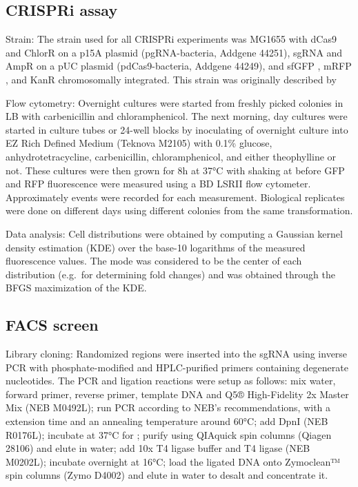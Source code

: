 \documentclass[10pt,oneside]{article}
\begin{document}
\subsection{CRISPRi assay}

Strain: The strain used for all CRISPRi experiments was \ecoli{} MG1655 with dCas9 and ChlorR on a p15A plasmid (pgRNA-bacteria, Addgene 44251), sgRNA and AmpR on a pUC plasmid (pdCas9-bacteria, Addgene 44249), and sfGFP \autocite{pedelacq2006}, mRFP \autocite{campbell2002}, and KanR chromosomally integrated.  This strain was originally described by 

Flow cytometry: Overnight cultures were started from freshly picked colonies in  LB with  carbenicillin and  chloramphenicol.  The next morning, day cultures were started in  culture tubes or 24-well blocks by inoculating  of overnight culture into  EZ Rich Defined Medium (Teknova M2105) with 0.1\% glucose,  an\-hydro\-tetra\-cycline,  carbenicillin,  chloramphenicol, and either  theophylline or not.  These cultures were then grown for 8h at 37°C with shaking at  before GFP and RFP fluorescence were measured using a BD LSRII flow cytometer.  Approximately \unit[10,000]{events} were recorded for each measurement.  Biological replicates were done on different days using different colonies from the same transformation.

Data analysis: Cell distributions were obtained by computing a Gaussian kernel density estimation (KDE) over the base-10 logarithms of the measured fluorescence values.  The mode was considered to be the center of each distribution (e.g.\ for determining fold changes) and was obtained through the BFGS maximization of the KDE.

\subsection{FACS screen}

Library cloning: Randomized regions were inserted into the sgRNA using inverse PCR with phosphate-modified and HPLC-purified primers containing degenerate nucleotides.  The PCR and ligation reactions were setup as follows: mix  water,   forward primer,   reverse primer,   template DNA and  Q5® High-Fidelity 2x Master Mix (NEB M0492L); run PCR according to NEB's recommendations, with a  extension time and an annealing temperature around 60°C; add   DpnI (NEB R0176L); incubate at 37°C for ; purify using QIAquick spin columns (Qiagen 28106) and elute in  water; add  10x T4 ligase buffer and   T4 ligase (NEB M0202L); incubate overnight at 16°C; load the ligated DNA onto Zymoclean™ spin columns (Zymo D4002) and elute in  water to desalt and concentrate it.
\end{document}
